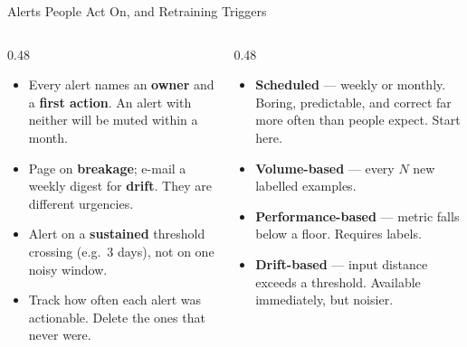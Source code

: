 \begin{frame}{Alerts People Act On, and Retraining Triggers}

    \begin{columns}[T]
        \begin{column}{0.48\textwidth}
            \begin{tcolorbox}[colback=red!5, colframe=red!50, title=\scriptsize Alerting rules that survive contact]
                \scriptsize
                \begin{itemize}
                    \item Every alert names an \textbf{owner} and a \textbf{first action}. An alert with
                          neither will be muted within a month.
                    \item Page on \textbf{breakage}; e-mail a weekly digest for \textbf{drift}. They are
                          different urgencies.
                    \item Alert on a \textbf{sustained} threshold crossing (e.g.\ 3 days), not on one noisy
                          window.
                    \item Track how often each alert was actionable. Delete the ones that never were.
                \end{itemize}
            \end{tcolorbox}
        \end{column}
        \begin{column}{0.48\textwidth}
            \begin{tcolorbox}[colback=green!5, colframe=green!50!black, title=\scriptsize When to retrain]
                \scriptsize
                \begin{itemize}
                    \item \textbf{Scheduled} --- weekly or monthly. Boring, predictable, and correct far more
                          often than people expect. Start here.
                    \item \textbf{Volume-based} --- every $N$ new labelled examples.
                    \item \textbf{Performance-based} --- metric falls below a floor. Requires labels.
                    \item \textbf{Drift-based} --- input distance exceeds a threshold. Available immediately,
                          but noisier.
                \end{itemize}
            \end{tcolorbox}
        \end{column}
    \end{columns}


\end{frame}
